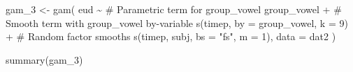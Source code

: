 \documentclass[
  letterpaper,
  DIV=11,
  numbers=noendperiod]{scrartcl}
\newenvironment{Shaded}{\begin{snugshade}}{\end{snugshade}}
\newcommand{\AttributeTok}[1]{\textcolor[rgb]{0.40,0.45,0.13}{#1}}
\newcommand{\CommentTok}[1]{\textcolor[rgb]{0.37,0.37,0.37}{#1}}
\newcommand{\DecValTok}[1]{\textcolor[rgb]{0.68,0.00,0.00}{#1}}
\newcommand{\FunctionTok}[1]{\textcolor[rgb]{0.28,0.35,0.67}{#1}}
\newcommand{\NormalTok}[1]{\textcolor[rgb]{0.00,0.23,0.31}{#1}}
\newcommand{\OtherTok}[1]{\textcolor[rgb]{0.00,0.23,0.31}{#1}}
\newcommand{\SpecialCharTok}[1]{\textcolor[rgb]{0.37,0.37,0.37}{#1}}
\newcommand{\StringTok}[1]{\textcolor[rgb]{0.13,0.47,0.30}{#1}}
\providecommand{\DIFadd}[1]{{\protect\color{blue}\uwave{#1}}} %
\providecommand{\DIFaddbegin}{} %
\providecommand{\DIFaddend}{} %
\newcommand{\DIFaddincludegraphics}[2][]{{\color{blue}\fbox{\DIFOincludegraphics[#1]{#2}}}} %
\DeclareRobustCommand{\DIFaddbegin}{\DIFOaddbegin \let\includegraphics\DIFaddincludegraphics} %
\DeclareRobustCommand{\DIFaddend}{\DIFOaddend \let\includegraphics\DIFOincludegraphics} %
\begin{document}
\begin{Shaded}
\begin{Highlighting}[]
\DIFaddbegin \DIFadd{\CommentTok{\# Fit model}
}\DIFaddend \NormalTok{gam\_3 }\OtherTok{\textless{}{-}} \FunctionTok{gam}\NormalTok{(}
  \DIFaddbegin \DIFadd{\AttributeTok{formula =}}\DIFaddend \NormalTok{ eud }\SpecialCharTok{\textasciitilde{}}
    \CommentTok{\# Parametric term for group\_vowel}
\NormalTok{    group\_vowel }\SpecialCharTok{+}
    \CommentTok{\# Smooth term with group\_vowel by{-}variable}
    \FunctionTok{s}\NormalTok{(timep, }\AttributeTok{by =}\NormalTok{ group\_vowel, }\AttributeTok{k =} \DecValTok{9}\NormalTok{) }\SpecialCharTok{+}
    \CommentTok{\# Random factor smooths}
    \FunctionTok{s}\NormalTok{(timep, subj, }\AttributeTok{bs =} \StringTok{"fs"}\NormalTok{, }\AttributeTok{m =} \DecValTok{1}\NormalTok{),}
  \AttributeTok{data =}\NormalTok{ dat2}
\NormalTok{)}
\end{Highlighting}
\end{Shaded}

\begin{Shaded}
\begin{Highlighting}[]
\DIFaddbegin \DIFadd{\CommentTok{\# Print model summary}
}\DIFaddend \FunctionTok{summary}\NormalTok{(gam\_3)}
\end{Highlighting}
\end{Shaded}
\end{document}
